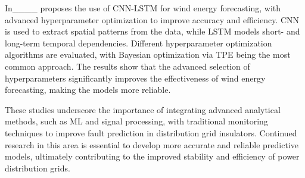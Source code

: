 In____ proposes the use of CNN-LSTM for wind energy forecasting, with advanced hyperparameter optimization to improve accuracy and efficiency. CNN is used to extract spatial patterns from the data, while LSTM models short- and long-term temporal dependencies. Different hyperparameter optimization algorithms are evaluated, %
with Bayesian optimization via TPE being the most common approach. The results show that the advanced selection of hyperparameters significantly improves the effectiveness of wind energy forecasting, making the models more %
reliable.

These studies underscore the importance of integrating advanced analytical methods, such as ML and signal processing, with traditional monitoring techniques to improve fault prediction in distribution grid insulators. Continued research in this area is essential to develop more accurate and reliable predictive models, ultimately contributing to the improved stability and efficiency of power distribution grids.